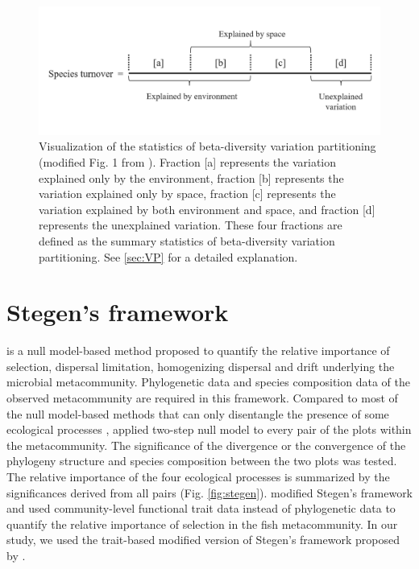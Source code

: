 	\begin{figure}
		\centering
		\includegraphics[width=\linewidth]{./figures/ppt/VP.png}
		\caption[Visualization of the statistics of beta-diversity variation partitioning.]{\small
			Visualization of the statistics of beta-diversity variation partitioning (modified Fig. 1 from \citealp{peres2006variation}). Fraction [a] represents the variation explained only by the environment, fraction [b] represents the variation explained only by space, fraction [c] represents the variation explained by both environment and space, and fraction [d] represents the unexplained variation. These four fractions are defined as the summary statistics of beta-diversity variation partitioning. See \autoref{sec:VP} for a detailed explanation.}
		\label{fig:VP}
	\end{figure}
	
	\section{Stegen's framework}
	\noindent
	\label{sec:Stegen}
	\citet{stegen2013quantifying} is a null model-based method proposed to quantify the relative importance of selection, dispersal limitation, homogenizing dispersal and drift underlying the microbial metacommunity. Phylogenetic data and species composition data of the observed metacommunity are required in this framework. Compared to most of the null model-based methods that can only disentangle the presence of some ecological processes \citep{ulrich2010null, chase2011disentangling}, \citet{stegen2013quantifying} applied two-step null model to every pair of the plots within the metacommunity. The significance of the divergence or the convergence of the phylogeny structure and species composition between the two plots was tested. The relative importance of the four ecological processes is summarized by the significances derived from all pairs (Fig. \ref{fig:stegen}). \citet{ford2020functional} modified Stegen's framework and used community-level functional trait data instead of phylogenetic data to quantify the relative importance of selection in the fish metacommunity. In our study, we used the trait-based modified version of Stegen's framework proposed by \citet{ford2020functional}.
	
